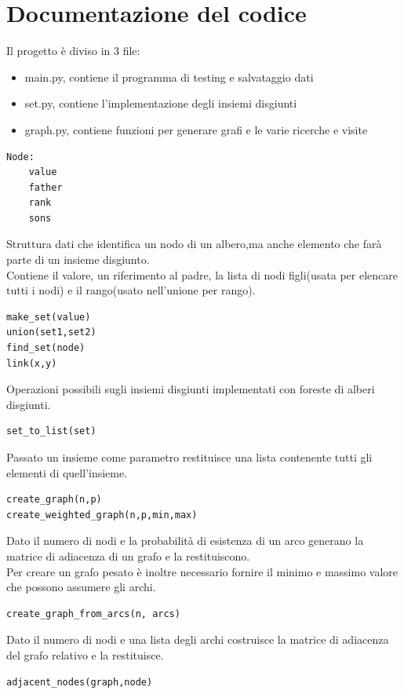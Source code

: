 \documentclass[]{article}
\begin{document}
\section{Documentazione del codice}
Il progetto è diviso in 3 file:
\begin{itemize}
\item main.py, contiene il programma di testing e salvataggio dati
\item set.py, contiene l'implementazione degli insiemi disgiunti
\item graph.py, contiene funzioni per generare grafi e le varie ricerche e visite
\end{itemize}
\begin{verbatim}
Node:
	value
	father
	rank
	sons
\end{verbatim}
Struttura dati che identifica un nodo di un albero,ma anche elemento che farà parte di un insieme disgiunto.\\
Contiene il valore, un riferimento al padre, la lista di nodi figli(usata per elencare tutti i nodi) e il rango(usato nell'unione per rango).\\
\begin{verbatim}
make_set(value)
union(set1,set2)
find_set(node)
link(x,y)
\end{verbatim}
Operazioni possibili sugli insiemi disgiunti implementati con foreste di alberi disgiunti.\\
\begin{verbatim}
set_to_list(set)
\end{verbatim}
Passato un insieme come parametro restituisce una lista contenente tutti gli elementi di quell'insieme.\\
\begin{verbatim}
create_graph(n,p)
create_weighted_graph(n,p,min,max)
\end{verbatim}
Dato il numero di nodi e la probabilità di esistenza di un arco generano la matrice di adiacenza di un grafo e la restituiscono.\\
Per creare un grafo pesato è inoltre necessario fornire il minimo e massimo valore che possono assumere gli archi.\\
\begin{verbatim}
create_graph_from_arcs(n, arcs)
\end{verbatim}
Dato il numero di nodi e una lista degli archi costruisce la matrice di adiacenza del grafo relativo e la restituisce.\\
\begin{verbatim}
adjacent_nodes(graph,node)
\end{verbatim}
\end{document}
